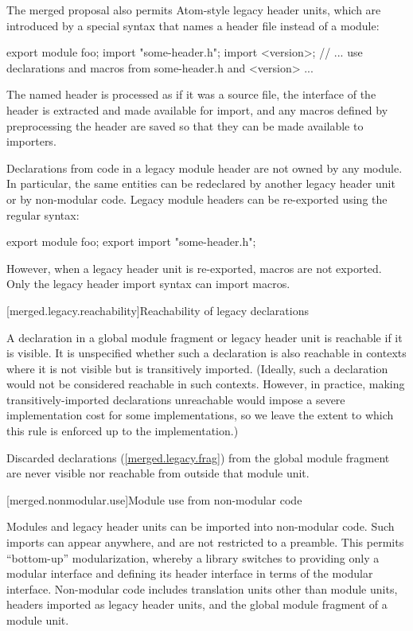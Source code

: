 \pnum
The merged proposal also permits Atom-style legacy header units,
which are introduced by a special  syntax
that names a header file instead of a module:

\begin{codeblock}
export module foo;
import "some-header.h";
import <version>;
// ... use declarations and macros from some-header.h and <version> ...
\end{codeblock}

\pnum
The named header is processed as if it was a source file,
the interface of the header is extracted and made available for import,
and any macros defined by preprocessing the header are saved
so that they can be made available to importers.

\pnum
Declarations from code in a legacy module header
are not owned by any module.
In particular, the same entities can be redeclared
by another legacy header unit or by non-modular code.
Legacy module headers can be re-exported
using the regular  syntax:

\begin{codeblock}
export module foo;
export import "some-header.h";
\end{codeblock}

However, when a legacy header unit is re-exported,
macros are not exported.
Only the legacy header import syntax can import macros.

[merged.legacy.reachability]{Reachability of legacy declarations}

\pnum
A declaration in a global module fragment or legacy header unit
is reachable if it is visible.
It is unspecified whether such a declaration is also reachable
in contexts where it is not visible but is transitively
imported.
(Ideally, such a declaration would not be considered reachable
in such contexts. However, in practice, making transitively-imported
declarations unreachable would impose a severe implementation
cost for some implementations, so we leave the extent to which
this rule is enforced up to the implementation.)

\pnum
Discarded declarations (\ref{merged.legacy.frag}) from the global module
fragment are never visible nor reachable from outside that module unit.

[merged.nonmodular.use]{Module use from non-modular code}

\pnum
Modules and legacy header units can be imported into non-modular code.
Such imports can appear anywhere, and are not restricted to a preamble.
This permits ``bottom-up'' modularization,
whereby a library switches to providing only a modular interface
and defining its header interface in terms of the modular interface.
Non-modular code includes translation units other than module units,
headers imported as legacy header units, and the global module fragment
of a module unit.

